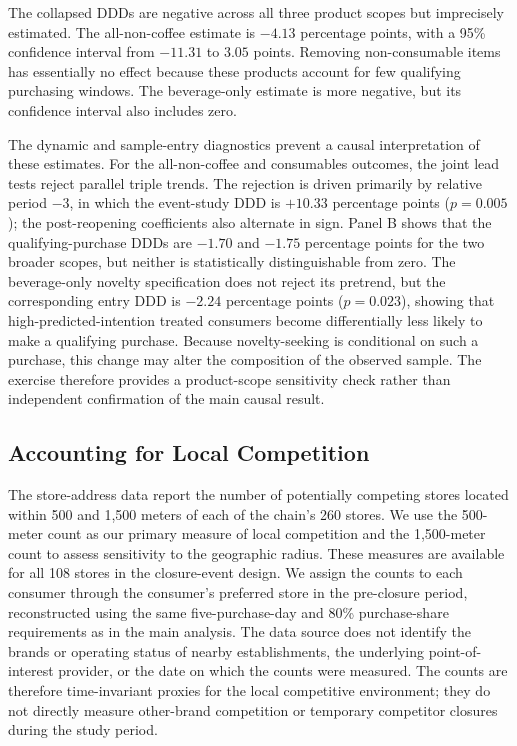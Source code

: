 \documentclass[11 pt]{article}
\begin{document}
The collapsed DDDs are negative across all three product scopes but imprecisely estimated. The all-non-coffee estimate is $-4.13$ percentage points, with a 95\% confidence interval from $-11.31$ to $3.05$ points. Removing non-consumable items has essentially no effect because these products account for few qualifying purchasing windows. The beverage-only estimate is more negative, but its confidence interval also includes zero.

The dynamic and sample-entry diagnostics prevent a causal interpretation of these estimates. For the all-non-coffee and consumables outcomes, the joint lead tests reject parallel triple trends. The rejection is driven primarily by relative period $-3$, in which the event-study DDD is $+10.33$ percentage points ($p=0.005$); the post-reopening coefficients also alternate in sign. Panel B shows that the qualifying-purchase DDDs are $-1.70$ and $-1.75$ percentage points for the two broader scopes, but neither is statistically distinguishable from zero. The beverage-only novelty specification does not reject its pretrend, but the corresponding entry DDD is $-2.24$ percentage points ($p=0.023$), showing that high-predicted-intention treated consumers become differentially less likely to make a qualifying purchase. Because novelty-seeking is conditional on such a purchase, this change may alter the composition of the observed sample. The exercise therefore provides a product-scope sensitivity check rather than independent confirmation of the main causal result.

\subsection{Accounting for Local Competition}
\label{app:robustness_competing_brands}

The store-address data report the number of potentially competing stores located within 500 and 1,500 meters of each of the chain's 260 stores. We use the 500-meter count as our primary measure of local competition and the 1,500-meter count to assess sensitivity to the geographic radius. These measures are available for all 108 stores in the closure-event design. We assign the counts to each consumer through the consumer's preferred store in the pre-closure period, reconstructed using the same five-purchase-day and 80\% purchase-share requirements as in the main analysis. The data source does not identify the brands or operating status of nearby establishments, the underlying point-of-interest provider, or the date on which the counts were measured. The counts are therefore time-invariant proxies for the local competitive environment; they do not directly measure other-brand competition or temporary competitor closures during the study period.
\end{document}
